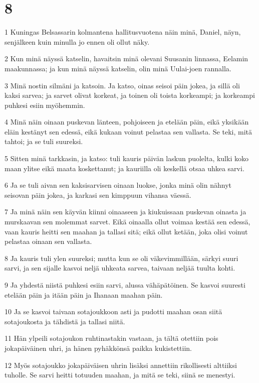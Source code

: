 \chapter{8}

\par 1 Kuningas Belsassarin kolmantena hallitusvuotena näin minä, Daniel, näyn, senjälkeen kuin minulla jo ennen oli ollut näky.
\par 2 Kun minä näyssä katselin, havaitsin minä olevani Suusanin linnassa, Eelamin maakunnassa; ja kun minä näyssä katselin, olin minä Uulai-joen rannalla.
\par 3 Minä nostin silmäni ja katsoin. Ja katso, oinas seisoi päin jokea, ja sillä oli kaksi sarvea; ja sarvet olivat korkeat, ja toinen oli toista korkeampi; ja korkeampi puhkesi esiin myöhemmin.
\par 4 Minä näin oinaan puskevan länteen, pohjoiseen ja etelään päin, eikä yksikään eläin kestänyt sen edessä, eikä kukaan voinut pelastaa sen vallasta. Se teki, mitä tahtoi; ja se tuli suureksi.
\par 5 Sitten minä tarkkasin, ja katso: tuli kauris päivän laskun puolelta, kulki koko maan ylitse eikä maata koskettanut; ja kauriilla oli keskellä otsaa uhkea sarvi.
\par 6 Ja se tuli aivan sen kaksisarvisen oinaan luokse, jonka minä olin nähnyt seisovan päin jokea, ja karkasi sen kimppuun vihansa väessä.
\par 7 Ja minä näin sen käyvän kiinni oinaaseen ja kiukuissaan puskevan oinasta ja murskaavan sen molemmat sarvet. Eikä oinaalla ollut voimaa kestää sen edessä, vaan kauris heitti sen maahan ja tallasi sitä; eikä ollut ketään, joka olisi voinut pelastaa oinaan sen vallasta.
\par 8 Ja kauris tuli ylen suureksi; mutta kun se oli väkevimmillään, särkyi suuri sarvi, ja sen sijalle kasvoi neljä uhkeata sarvea, taivaan neljää tuulta kohti.
\par 9 Ja yhdestä niistä puhkesi esiin sarvi, alussa vähäpätöinen. Se kasvoi suuresti etelään päin ja itään päin ja Ihanaan maahan päin.
\par 10 Ja se kasvoi taivaan sotajoukkoon asti ja pudotti maahan osan siitä sotajoukosta ja tähdistä ja tallasi niitä.
\par 11 Hän ylpeili sotajoukon ruhtinastakin vastaan, ja tältä otettiin pois jokapäiväinen uhri, ja hänen pyhäkkönsä paikka kukistettiin.
\par 12 Myös sotajoukko jokapäiväisen uhrin lisäksi annettiin rikollisesti alttiiksi tuholle. Se sarvi heitti totuuden maahan, ja mitä se teki, siinä se menestyi.
